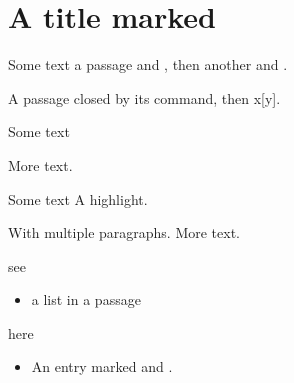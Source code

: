 \flmHeading[toc=true]
\section{A title marked}{\flmLabels{}}

Some text a passage and , then another and .

A passage closed by its command,{} then x[y].

Some text 

 More text.

Some text A highlight.

With multiple paragraphs. More text.

see \begin{itemize}\item a list in a passage\end{itemize} here 

\begin{itemize}
\item An entry marked and .
\end{itemize}

